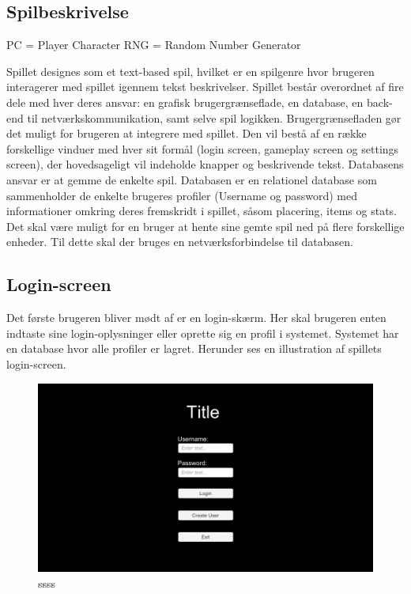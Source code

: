 \newpage

\subsection{Spilbeskrivelse}

PC = Player Character
RNG = Random Number Generator

Spillet designes som et text-based spil, hvilket er en spilgenre hvor brugeren interagerer med spillet igennem tekst beskrivelser. Spillet består overordnet af fire dele med hver deres ansvar: en grafisk brugergrænseflade, en database, en back-end til netværkskommunikation, samt selve spil logikken. Brugergrænsefladen gør det muligt for brugeren at integrere med spillet. Den vil bestå af en række forskellige vinduer med hver sit formål (login screen, gameplay screen og settings screen), der hovedsageligt vil indeholde knapper og beskrivende tekst. Databasens ansvar er at gemme de enkelte spil. Databasen er en relationel database som sammenholder de enkelte brugeres profiler (Username og password) med informationer omkring deres fremskridt i spillet, såsom placering, items og stats. Det skal være muligt for en bruger at hente sine gemte spil ned på flere forskellige enheder. Til dette skal der bruges en netværksforbindelse til databasen.   

\subsection{Login-screen}
Det første brugeren bliver mødt af er en login-skærm. Her skal brugeren enten indtaste sine login-oplysninger eller oprette sig en profil i systemet. Systemet har en database hvor alle profiler er lagret. Herunder ses en illustration af spillets login-screen. 

\begin{figure}[H]
\centering
\includegraphics[width = \textwidth]{02-Body/Images/Loginscreen-udkast.png}
\caption{ssss}
\label{fig:Loginscreen-udkast}
\end{figure}


